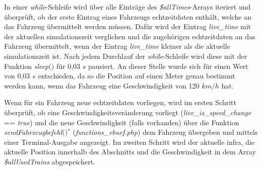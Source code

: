 In einer \textit{while}-Schleife wird über alle Einträge des \textit{\$allTimes}-Arrays iteriert und überprüft, ob der erste Eintrag eines Fahrzeugs \Gls{echtzeitdaten} enthält, welche an das Fahrzeug übermittelt werden müssen. Dafür wird der Eintrag \textit{live\_time} mit der aktuellen \Gls{simulationszeit} verglichen und die zugehörigen  \Gls{echtzeitdaten} an das Fahrzeug übermittelt, wenn der Eintrag \textit{live\_time} kleiner als die aktuelle \Gls{simulationszeit} ist. Nach jedem Durchlauf der \textit{while}-Schleife wird diese mit der Funktion \textit{sleep$($$)$} für 0,03 $s$ pausiert. An dieser Stelle wurde sich für einen Wert von 0,03 $s$ entschieden, da so die Position auf einen Meter genau bestimmt werden kann, wenn das Fahrzeug eine Geschwindigkeit von 120 $km/h$ hat.

Wenn für ein Fahrzeug neue \Gls{echtzeitdaten} vorliegen, wird im ersten Schritt überprüft, ob eine Geschwindigkeitsveränderung vorliegt (\textit{live\_is\_speed\_change} == \textit{true}) und die neue Geschwindigkeit (falls vorhanden) über die Funktion \textit{sendFahrzeugbefehl$($$)$}$^\ast$ (\textit{functions\_ebuef.php}) dem Fahrzeug übergeben und mittels einer Terminal-Ausgabe angezeigt. Im zweiten Schritt wird der aktuelle \ac{infra}, die aktuelle Position innerhalb des Abschnitts und die Geschwindigkeit in dem Array \textit{\$allUsedTrains} abgespeichert. 

